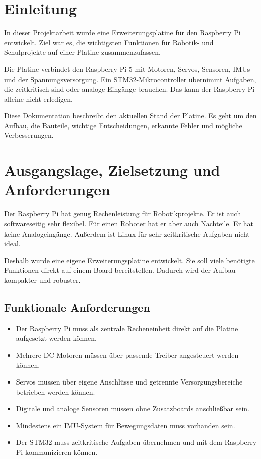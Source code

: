 \section{Einleitung}
In dieser Projektarbeit wurde eine Erweiterungsplatine für den Raspberry Pi entwickelt. Ziel war es, die wichtigsten Funktionen für Robotik- und Schulprojekte auf einer Platine zusammenzufassen.

Die Platine verbindet den Raspberry Pi 5 mit Motoren, Servos, Sensoren, IMUs und der Spannungsversorgung. Ein STM32-Mikrocontroller übernimmt Aufgaben, die zeitkritisch sind oder analoge Eingänge brauchen. Das kann der Raspberry Pi alleine nicht erledigen.

Diese Dokumentation beschreibt den aktuellen Stand der Platine. Es geht um den Aufbau, die Bauteile, wichtige Entscheidungen, erkannte Fehler und mögliche Verbesserungen.

\section{Ausgangslage, Zielsetzung und Anforderungen}
Der Raspberry Pi hat genug Rechenleistung für Robotikprojekte. Er ist auch softwareseitig sehr flexibel. Für einen Roboter hat er aber auch Nachteile. Er hat keine Analogeingänge. Außerdem ist Linux für sehr zeitkritische Aufgaben nicht ideal.

Deshalb wurde eine eigene Erweiterungsplatine entwickelt. Sie soll viele benötigte Funktionen direkt auf einem Board bereitstellen. Dadurch wird der Aufbau kompakter und robuster.


\subsection{Funktionale Anforderungen}
\begin{itemize}
	\item Der Raspberry Pi muss als zentrale Recheneinheit direkt auf die Platine aufgesetzt werden können.
	\item Mehrere DC-Motoren müssen über passende Treiber angesteuert werden können.
	\item Servos müssen über eigene Anschlüsse und getrennte Versorgungsbereiche betrieben werden können.
	\item Digitale und analoge Sensoren müssen ohne Zusatzboards anschließbar sein.
	\item Mindestens ein IMU-System für Bewegungsdaten muss vorhanden sein.
	\item Der STM32 muss zeitkritische Aufgaben übernehmen und mit dem Raspberry Pi kommunizieren können.
\end{itemize}

